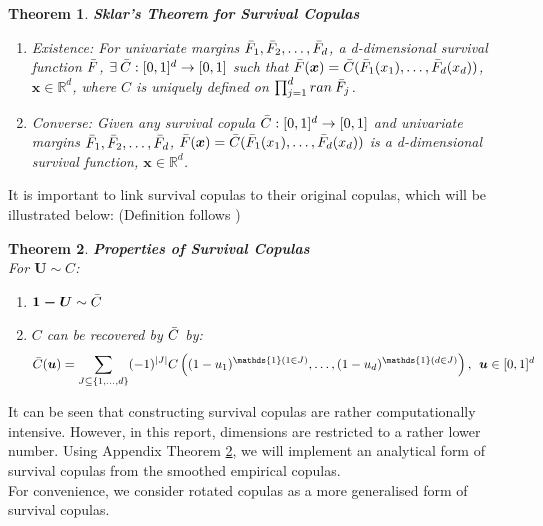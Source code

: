 \documentclass[12pt]{report}
\newtheorem{theorem}{Theorem}[subsection]
\newcommand{\1}{\mathbf{1}}
\begin{document}
\begin{theorem}\label{SklarTheoremSurvival}
\textit{\normalfont\parencite{HofertBook}}
\:\textbf{Sklar's Theorem for Survival Copulas} \\
\begin{enumerate}

\item Existence: For univariate margins $\Bar{F}_{1}, \Bar{F}_{2}, \dots, \Bar{F}_{d}$, a d-dimensional survival function $\Bar{F}$, $\exists \: \Bar{C}: [0,1]^{d} \rightarrow [0,1]$ such that $\Bar{F}(\boldsymbol{x}) = \Bar{C}(\Bar{F}_{1}(x_{1}), \dots, \Bar{F}_{d}(x_{d}))$, $\boldsymbol{x} \in \mathbb{R}^{d}$, where $C$ is uniquely defined on $\prod_{j=1}^{d} ran \: \Bar{F}_{j}$.
\item Converse: Given any survival copula $\Bar{C}: [0,1]^{d} \rightarrow [0,1]$ and univariate margins $\Bar{F}_{1}, \Bar{F}_{2}, \dots, \Bar{F}_{d}$, $\Bar{F}(\boldsymbol{x}) = \Bar{C}(\Bar{F}_{1}(x_{1}), \dots, \Bar{F}_{d}(x_{d}))$ is a d-dimensional survival function, $\boldsymbol{x} \in \mathbb{R}^{d}$.
\end{enumerate}
\end{theorem}

It is important to link survival copulas to their original copulas, which will be illustrated below: (Definition follows \cite{HofertBook})

\begin{theorem}\label{SurvivalCopulaProperties}
\textit{\normalfont\parencite{HofertBook}}
\:\textbf{Properties of Survival Copulas} \\
For $\boldsymbol{U} \sim C$:
\begin{enumerate}
\item $\boldsymbol{1 - U} \sim \Bar{C}$
\item $C$ can be recovered by $\Bar{C}$ by:
\begin{align*}
\Bar{C}(\boldsymbol{u}) = \sum\limits_{J \subseteq \{1, \dots, d \} }(-1)^{|J|}C \left( (1 - u_{1})^{\mathds{1}(1\in J)}, \dots, (1 - u_{d})^{\mathds{1}(d\in J)} \right), \: \: \boldsymbol{u} \in [0,1]^{d}
\end{align*}
\end{enumerate}
\end{theorem}

It can be seen that constructing survival copulas are rather computationally intensive. However, in this report, dimensions are restricted to a rather lower number. Using Appendix Theorem \ref{SurvivalCopulaProperties}, we will implement an analytical form of survival copulas from the smoothed empirical copulas.\\
\vspace{0.5cm}
For convenience, we consider rotated copulas as a more generalised form of survival copulas.
\end{document}
